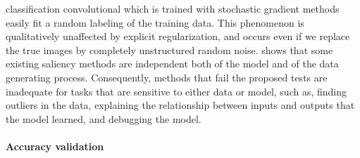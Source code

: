 classification convolutional which is trained with stochastic gradient methods easily fit a random labeling of the training data. This phenomenon is qualitatively unaffected by explicit regularization, and occurs even if we replace the true images by completely unstructured random noise. \cite{adebayo2018sanity} shows that some existing saliency methods are independent both of the model and of the data generating process. Consequently, methods that fail the proposed tests are inadequate for tasks that are sensitive to either data or model, such as, finding outliers in the data, explaining the relationship between inputs and outputs that the model learned, and debugging the model.
\textbf{}
\paragraph{\textbf{Accuracy validation}}
